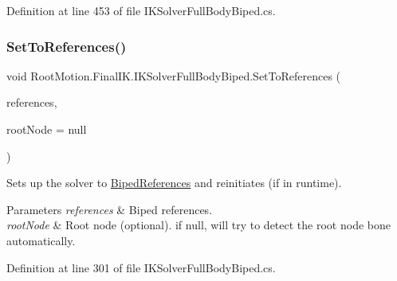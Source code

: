 Definition at line 453 of file I\+K\+Solver\+Full\+Body\+Biped.\+cs.

\mbox{\label{class_root_motion_1_1_final_i_k_1_1_i_k_solver_full_body_biped_aa97e0a279a2cd49d947da470ca41a28f}} 
\subsubsection{\texorpdfstring{Set\+To\+References()}{SetToReferences()}}
{\footnotesize\ttfamily void Root\+Motion.\+Final\+I\+K.\+I\+K\+Solver\+Full\+Body\+Biped.\+Set\+To\+References (\begin{DoxyParamCaption}\item[{\mbox{\hyperlink{class_root_motion_1_1_biped_references}{Biped\+References}}}]{references,  }\item[{Transform}]{root\+Node = {\ttfamily null} }\end{DoxyParamCaption})}



Sets up the solver to \mbox{\hyperlink{class_root_motion_1_1_biped_references}{Biped\+References}} and reinitiates (if in runtime). 


\begin{DoxyParams}{Parameters}
{\em references} & Biped references.\\
\hline
{\em root\+Node} & Root node (optional). if null, will try to detect the root node bone automatically. \\
\hline
\end{DoxyParams}


Definition at line 301 of file I\+K\+Solver\+Full\+Body\+Biped.\+cs.

\mbox{\label{class_root_motion_1_1_final_i_k_1_1_i_k_solver_full_body_biped_aaf274661bb29e50507fdf3f3f33473b6}} 
